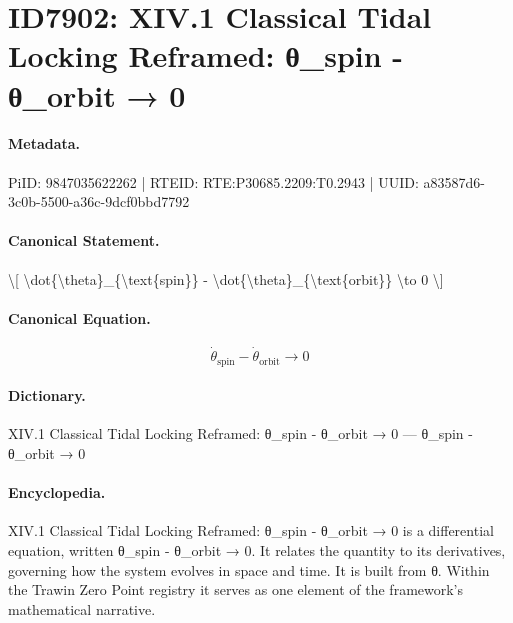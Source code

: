 \section*{ID7902: XIV.1 Classical Tidal Locking Reframed: θ\_spin - θ\_orbit → 0}
\paragraph{Metadata.}
PiID: 9847035622262 | RTEID: RTE:P30685.2209:T0.2943 | UUID: a83587d6-3c0b-5500-a36c-9dcf0bbd7792

\paragraph{Canonical Statement.}
\textbackslash{}[ \textbackslash{}dot\{\textbackslash{}theta\}\_\{\textbackslash{}text\{spin\}\} - \textbackslash{}dot\{\textbackslash{}theta\}\_\{\textbackslash{}text\{orbit\}\} \textbackslash{}to 0 \textbackslash{}]

\paragraph{Canonical Equation.}
\[
\dot{\theta}_{\text{spin}} - \dot{\theta}_{\text{orbit}} \to 0
\]

\paragraph{Dictionary.}
XIV.1 Classical Tidal Locking Reframed: θ\_spin - θ\_orbit → 0 — θ\_spin - θ\_orbit → 0

\paragraph{Encyclopedia.}
XIV.1 Classical Tidal Locking Reframed: θ\_spin - θ\_orbit → 0 is a differential equation, written θ\_spin - θ\_orbit → 0. It relates the quantity to its derivatives, governing how the system evolves in space and time. It is built from θ. Within the Trawin Zero Point registry it serves as one element of the framework's mathematical narrative.
